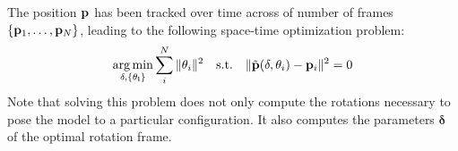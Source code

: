 The position $\mathbf{p}$ has been tracked over time across of number of frames $\{\mathbf{p}_1, \dots, \mathbf{p}_N\}$, leading to the following space-time optimization problem:
% 
\begin{eqnarray}
\operatorname*{arg\,min}_{\mathbf{\delta}, \{\mathbf{\theta_i}\}} \sum_i^N \| \mathbf{\theta}_i \|^2 \quad \text{s.t.} \quad \| \tilde{\mathbf{p}}(\mathbf{\delta}, \mathbf{\theta}_i) - \mathbf{p}_i \|^2 = 0
\label{eq:kinopt}    
\end{eqnarray}
Note that solving this problem does not only compute the rotations necessary to pose the model to a particular configuration. It also computes the parameters $\mathbf{\delta}$ of the optimal rotation frame. 

\ATFINISH

\newpage
{}

